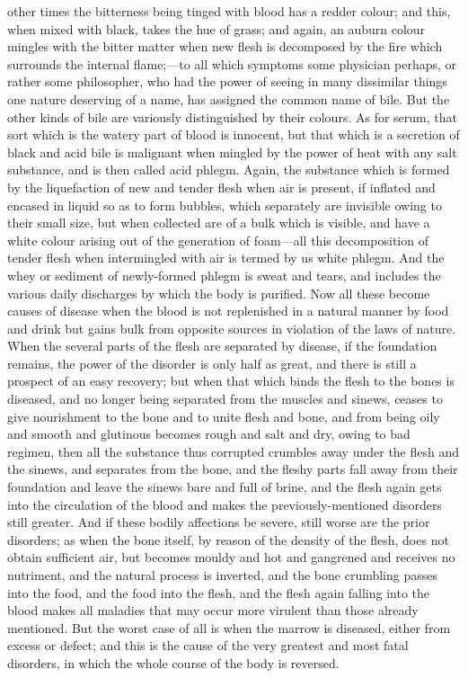\documentclass[12pt]{article}
\begin{document}
other times the bitterness being tinged with blood has a redder colour; and this, when mixed with black, takes the hue of grass; and again, an auburn colour mingles with the bitter matter when new flesh is decomposed by the fire which surrounds the internal flame;---to all which symptoms some physician perhaps, or rather some philosopher, who had the power of seeing in many dissimilar things one nature deserving of a name, has assigned the common name of bile. But the other kinds of bile are variously distinguished by their colours. As for serum, that sort which is the watery part of blood is innocent, but that which is a secretion of black and acid bile is malignant when mingled by the power of heat with any salt substance, and is then called acid phlegm. Again, the substance which is formed by the liquefaction of new and tender flesh when air is present, if inflated and encased in liquid so as to form bubbles, which separately are invisible owing to their small size, but when collected are of a bulk which is visible, and have a white colour arising out of the generation of foam---all this decomposition of tender flesh when intermingled with air is termed by us white phlegm. And the whey or sediment of newly-formed phlegm is sweat and tears, and includes the various daily discharges by which the body is purified. Now all these become causes of disease when the blood is not replenished in a natural manner by food and drink but gains bulk from opposite sources in violation of the laws of nature. When the several parts of the flesh are separated by disease, if the foundation remains, the power of the disorder is only half as great, and there is still a prospect of an easy recovery; but when that which binds the flesh to the bones is diseased, and no longer being separated from the muscles and sinews, ceases to give nourishment to the bone and to unite flesh and bone, and from being oily and smooth and glutinous becomes rough and salt and dry, owing to bad regimen, then all the substance thus corrupted crumbles away under the flesh and the sinews, and separates from the bone, and the fleshy parts fall away from their foundation and leave the sinews bare and full of brine, and the flesh again gets into the circulation of the blood and makes the previously-mentioned disorders still greater. And if these bodily affections be severe, still worse are the prior disorders; as when the bone itself, by reason of the density of the flesh, does not obtain sufficient air, but becomes mouldy and hot and gangrened and receives no nutriment, and the natural process is inverted, and the bone crumbling passes into the food, and the food into the flesh, and the flesh again falling into the blood makes all maladies that may occur more virulent than those already mentioned. But the worst case of all is when the marrow is diseased, either from excess or defect; and this is the cause of the very greatest and most fatal disorders, in which the whole course of the body is reversed.
\end{document}

